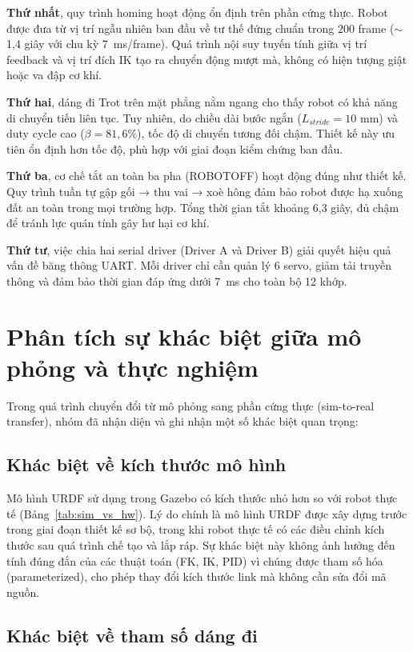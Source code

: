 \textbf{Thứ nhất}, quy trình homing hoạt động ổn định trên phần cứng thực. Robot được đưa từ vị trí ngẫu nhiên ban đầu về tư thế đứng chuẩn trong 200 frame ($\sim$1,4 giây với chu kỳ 7~ms/frame). Quá trình nội suy tuyến tính giữa vị trí feedback và vị trí đích IK tạo ra chuyển động mượt mà, không có hiện tượng giật hoặc va đập cơ khí.

\textbf{Thứ hai}, dáng đi Trot trên mặt phẳng nằm ngang cho thấy robot có khả năng di chuyển tiến liên tục. Tuy nhiên, do chiều dài bước ngắn ($L_{stride} = 10$ mm) và duty cycle cao ($\beta = 81{,}6\%$), tốc độ di chuyển tương đối chậm. Thiết kế này ưu tiên ổn định hơn tốc độ, phù hợp với giai đoạn kiểm chứng ban đầu.

\textbf{Thứ ba}, cơ chế tắt an toàn ba pha (ROBOTOFF) hoạt động đúng như thiết kế. Quy trình tuần tự gập gối → thu vai → xoè hông đảm bảo robot được hạ xuống đất an toàn trong mọi trường hợp. Tổng thời gian tắt khoảng 6,3 giây, đủ chậm để tránh lực quán tính gây hư hại cơ khí.

\textbf{Thứ tư}, việc chia hai serial driver (Driver A và Driver B) giải quyết hiệu quả vấn đề băng thông UART. Mỗi driver chỉ cần quản lý 6 servo, giảm tải truyền thông và đảm bảo thời gian đáp ứng dưới 7~ms cho toàn bộ 12 khớp.

\section{Phân tích sự khác biệt giữa mô phỏng và thực nghiệm}

Trong quá trình chuyển đổi từ mô phỏng sang phần cứng thực (sim-to-real transfer), nhóm đã nhận diện và ghi nhận một số khác biệt quan trọng:

\subsection{Khác biệt về kích thước mô hình}

Mô hình URDF sử dụng trong Gazebo có kích thước nhỏ hơn so với robot thực tế (Bảng~\ref{tab:sim_vs_hw}). Lý do chính là mô hình URDF được xây dựng trước trong giai đoạn thiết kế sơ bộ, trong khi robot thực tế có các điều chỉnh kích thước sau quá trình chế tạo và lắp ráp. Sự khác biệt này không ảnh hưởng đến tính đúng đắn của các thuật toán (FK, IK, PID) vì chúng được tham số hóa (parameterized), cho phép thay đổi kích thước link mà không cần sửa đổi mã nguồn.

\subsection{Khác biệt về tham số dáng đi}

